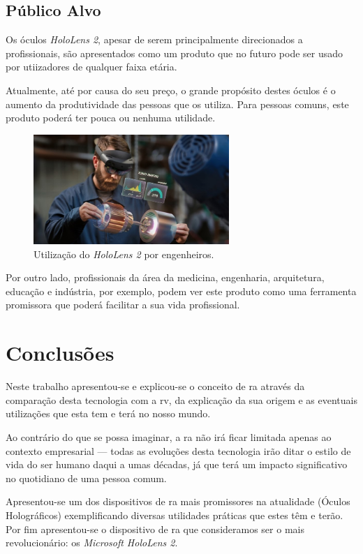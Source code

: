 \documentclass{report}
\begin{document}
\section{Público Alvo}

Os óculos \textit{HoloLens 2}, apesar de serem principalmente direcionados a profissionais, são apresentados como um produto que no futuro pode ser usado por utiizadores de qualquer faixa etária.

Atualmente, até por causa do seu preço, o grande propósito destes óculos é o aumento da produtividade das pessoas que os utiliza. Para pessoas comuns, este produto poderá ter pouca ou nenhuma utilidade.

\begin{figure}[H]
    \centering
    \includegraphics[width=20em]{engenheirolens.png}
    \caption{Utilização do \textit{HoloLens 2} por engenheiros.}
    \label{Fig:hololens3}
\end{figure}

Por outro lado, profissionais da área da medicina, engenharia, arquitetura, educação e indústria, por exemplo, podem ver este produto como uma ferramenta promissora que poderá facilitar a sua vida profissional.

\chapter{Conclusões}
\label{chap.conclusao}
Neste trabalho apresentou-se e explicou-se o conceito de \ac{ra} através da comparação desta tecnologia com a \ac{rv}, da explicação da sua origem e as eventuais utilizações que esta tem e terá no nosso mundo.

Ao contrário do que se possa imaginar, a \ac{ra} não irá ficar limitada apenas ao contexto empresarial — todas as evoluções desta tecnologia irão ditar o estilo de vida do ser humano daqui a umas décadas, já que terá um impacto significativo no quotidiano de uma pessoa comum.

Apresentou-se um dos dispositivos de \ac{ra} mais promissores na atualidade (Óculos Holográficos) exemplificando diversas utilidades práticas que estes têm e terão. Por fim apresentou-se o dispositivo de \ac{ra} que consideramos ser o mais revolucionário: os \textit{Microsoft HoloLens 2}.
\end{document}
